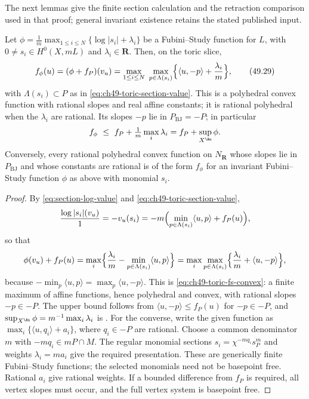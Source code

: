 The next lemmas give the finite section calculation and the retraction
comparison used in that proof; general invariant existence retains
the stated published input.

\begin{lemma}
\label{lem:ch49-toric-finite-level}
Let $\phi=\frac1m\max_{1\le i\le N}\{\log|s_i|+\lambda_i\}$ be a
Fubini--Study function for $L$, with $0\ne s_i\in H^0(X,mL)$ and
$\lambda_i\in\mathbf R$.  Then, on the toric slice,
\[
 f_\phi(u)=(\phi+f_P)(v_u)
 =\max_{1\le i\le N}\ \max_{p\in\Lambda(s_i)}
   \Bigl\{\langle u,-p\rangle+\frac{\lambda_i}{m}\Bigr\},
\tag{49.29}\label{eq:ch49-toric-fs-convex}
\]
with $\Lambda(s_i)\subset P$ as in
\eqref{eq:ch49-toric-section-value}.  This is a polyhedral convex
function with rational slopes and real affine constants; it is rational
polyhedral when the $\lambda_i$ are rational.  Its slopes $-p$ lie in
$P_{\mathrm{BJ}}=-P$; in particular
\[
 f_\phi\ \le\ f_P+\tfrac1m\max_i\lambda_i
 =f_P+\sup_{X^{\An}}\phi .
\]
Conversely, every rational polyhedral convex function on
$N_{\mathbf R}$ whose slopes lie in $P_{\mathrm{BJ}}$ and whose
constants are rational is of the form $f_\phi$ for an invariant
Fubini--Study function $\phi$ as above with monomial $s_i$.
\end{lemma}

\begin{proof}
By \eqref{eq:section-log-value} and
\eqref{eq:ch49-toric-section-value},
\[
 \frac{\log|s_i|(v_u)}{1}=-v_u(s_i)
 =-m\Bigl(\min_{p\in\Lambda(s_i)}\langle u,p\rangle+f_P(u)\Bigr),
\]
so that
\[
 \phi(v_u)+f_P(u)
 =\max_i\Bigl\{\frac{\lambda_i}{m}-\min_{p\in\Lambda(s_i)}\langle u,p\rangle
 \Bigr\}
 =\max_i\max_{p\in\Lambda(s_i)}
   \Bigl\{\frac{\lambda_i}{m}+\langle u,-p\rangle\Bigr\},
\]
because $-\min_p\langle u,p\rangle=\max_p\langle u,-p\rangle$.  This is
\eqref{eq:ch49-toric-fs-convex}: a finite maximum of affine functions,
hence polyhedral and convex, with rational slopes $-p\in-P$.  The upper
bound follows from $\langle u,-p\rangle\le f_P(u)$ for $-p\in-P$, and
$\sup_{X^{\An}}\phi=m^{-1}\max_i\lambda_i$ is
.  For the converse, write the given function as
$\max_i\{\langle u,q_i\rangle+a_i\}$, where $q_i\in-P$ are rational.
Choose a common denominator $m$ with $-mq_i\in mP\cap M$.
The regular monomial sections $s_i=\chi^{-mq_i}s_P^m$ and
weights $\lambda_i=ma_i$ give the required presentation.
These are generically finite Fubini--Study functions; the selected
monomials need not be basepoint free.  Rational $a_i$ give rational
weights.  If a bounded difference from $f_P$ is required, all vertex
slopes must occur, and the full vertex system is basepoint free.
\end{proof}

